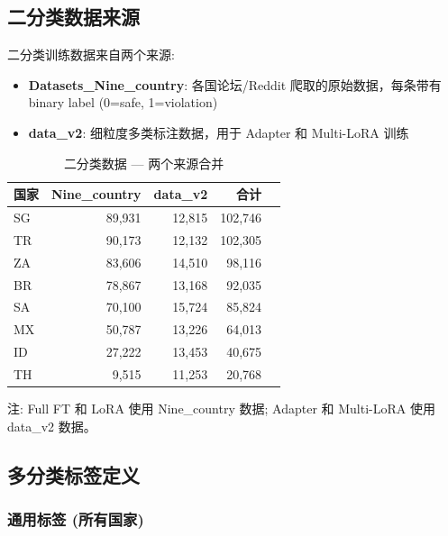 \documentclass[11pt,a4paper]{article}
\begin{document}
\subsection{二分类数据来源}

二分类训练数据来自两个来源:
\begin{itemize}
\item \textbf{Datasets\_Nine\_country}: 各国论坛/Reddit 爬取的原始数据，每条带有 binary label (0=safe, 1=violation)
\item \textbf{data\_v2}: 细粒度多类标注数据，用于 Adapter 和 Multi-LoRA 训练
\end{itemize}

\begin{table}[h]\centering
\caption{二分类数据 — 两个来源合并}\label{tab:bin-data-full}
\begin{tabular}{@{}lrrrr@{}}
\toprule
\textbf{国家} & \textbf{Nine\_country} & \textbf{data\_v2} & \textbf{合计} \\
\midrule
SG & 89,931 & 12,815 & 102,746 \\
TR & 90,173 & 12,132 & 102,305 \\
ZA & 83,606 & 14,510 & 98,116 \\
BR & 78,867 & 13,168 & 92,035 \\
SA & 70,100 & 15,724 & 85,824 \\
MX & 50,787 & 13,226 & 64,013 \\
ID & 27,222 & 13,453 & 40,675 \\
TH & 9,515 & 11,253 & 20,768 \\
\bottomrule
\end{tabular}
\par\smallskip
\small 注: Full FT 和 LoRA 使用 Nine\_country 数据; Adapter 和 Multi-LoRA 使用 data\_v2 数据。
\end{table}

\subsection{多分类标签定义}

\subsubsection{通用标签 (所有国家)}
\end{document}
